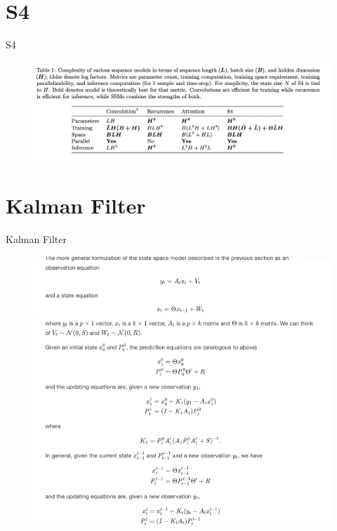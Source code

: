 \documentclass{beamer}
\begin{document}
\section{S4}

\begin{frame}{S4}
    \begin{figure}
        \centering
        \includegraphics[scale=0.35]{comparsion.png}
    \end{figure}
\end{frame}

\section{Kalman Filter}

\begin{frame}{Kalman Filter}
    \begin{figure}
        \centering
        \includegraphics[scale=0.35]{Kalman.png}
    \end{figure}
\end{frame}
\end{document}
